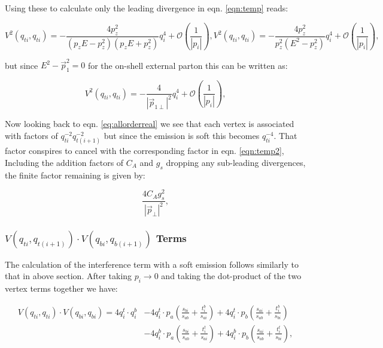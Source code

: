 			Using these to calculate only the leading divergence in eqn. \eqref{eqn:temp} reads:

			\begin{subequations}
				\begin{equation}
				V^2(q_{ti}, q_{ti}) = - \frac{4p_z^2}{(p_zE - p_z^2)(p_zE + p_z^2)}q^4_{i} + \mathcal{O}\left(\frac{1}{|p_i|}\right),
				\end{equation}
				\begin{equation}
				V^2(q_{ti}, q_{ti}) = - \frac{4p_z^2}{p_z^2(E^2-p_z^2)}q^4_{i} + \mathcal{O}\left(\frac{1}{|p_i|}\right),
				\end{equation}
			\end{subequations}

			but since $E^2-\vec{p}_1^2=0$ for the on-shell external parton this can be written as:

			\begin{equation}
				V^2(q_{ti}, q_{ti}) = - \frac{4}{|\vec{p}_{1\perp}|^2}q^4_{i} + \mathcal{O}\left(\frac{1}{|p_i|}\right),
				\label{eqn:temp2}
			\end{equation}

			Now looking back to eqn. \eqref{eq:allorderreal} we see that each vertex is associated with factors of
			$q^{-2}_{ti}q^{-2}_{t(i+1)}$ but since the emission is soft this becomes $q^{-4}_{ti}$.
			That factor conspires to cancel with the corresponding factor in eqn. \eqref{eqn:temp2},
			Including the addition factors of $C_A$ and $g_s$ dropping any sub-leading divergences, the finite factor remaining is given by:

			\begin{equation}
				\frac{4C_Ag_s^2}{|\vec{p}_\perp|^2},
				\label{eqn:finalsoft}
			\end{equation}

		\subsubsection{$V(q_{ti}, q_{t(i+1)})\cdot V(q_{bi}, q_{b(i+1)})$ Terms}
			\label{sub:subsection_name}

			The calculation of the interference term with a soft emission follows similarly to
			that in above section. After taking $p_i\rightarrow0$ and taking the dot-product of
			the two vertex terms together we have:

			\begin{equation}
			\begin{split}
				V(q_{ti}, q_{ti})\cdot V(q_{bi}, q_{bi}) =
				4q_i^t\cdot q_i^b &- 4q_i^t\cdot p_a\left(\frac{s_{bi}}{s_{ab}} +
				\frac{t_i^b}{s_{ai}}\right) + 4q_i^t\cdot p_b\left(\frac{s_{ai}}{s_{ab}} +
				\frac{t_i^b}{s_{bi}}\right)\\
				&- 4q_i^b\cdot p_a\left(\frac{s_{bi}}{s_{ab}} + \frac{t_i^t}{s_{ai}}\right) +
				4q_i^b\cdot p_b\left(\frac{s_{ai}}{s_{ab}} +
				\frac{t_i^t}{s_{bi}}\right),\\
			\end{split}
			\end{equation}

